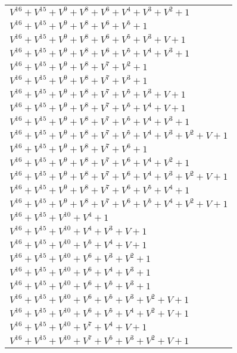 \documentclass[12pt]{article}
\begin{document}
\begin{adjustwidth}{-4cm}{}
\begin{center}
\begin{longtable}{|l|}
$V^{16}  +V^{15}  +V^{9}  +V^{8}  +V^{6}  +V^{4}  +V^{3}  +V^{2}  + 1$ \\
$V^{16}  +V^{15}  +V^{9}  +V^{8}  +V^{6}  +V^{5}  + 1$ \\
$V^{16}  +V^{15}  +V^{9}  +V^{8}  +V^{6}  +V^{5}  +V^{3}  + V + 1$ \\
$V^{16}  +V^{15}  +V^{9}  +V^{8}  +V^{6}  +V^{5}  +V^{4}  +V^{3}  + 1$ \\
$V^{16}  +V^{15}  +V^{9}  +V^{8}  +V^{7}  +V^{2}  + 1$ \\
$V^{16}  +V^{15}  +V^{9}  +V^{8}  +V^{7}  +V^{3}  + 1$ \\
$V^{16}  +V^{15}  +V^{9}  +V^{8}  +V^{7}  +V^{5}  +V^{3}  + V + 1$ \\
$V^{16}  +V^{15}  +V^{9}  +V^{8}  +V^{7}  +V^{5}  +V^{4}  + V + 1$ \\
$V^{16}  +V^{15}  +V^{9}  +V^{8}  +V^{7}  +V^{5}  +V^{4}  +V^{3}  + 1$ \\
$V^{16}  +V^{15}  +V^{9}  +V^{8}  +V^{7}  +V^{5}  +V^{4}  +V^{3}  +V^{2}  + V + 1$ \\
$V^{16}  +V^{15}  +V^{9}  +V^{8}  +V^{7}  +V^{6}  + 1$ \\
$V^{16}  +V^{15}  +V^{9}  +V^{8}  +V^{7}  +V^{6}  +V^{4}  +V^{2}  + 1$ \\
$V^{16}  +V^{15}  +V^{9}  +V^{8}  +V^{7}  +V^{6}  +V^{4}  +V^{3}  +V^{2}  + V + 1$ \\
$V^{16}  +V^{15}  +V^{9}  +V^{8}  +V^{7}  +V^{6}  +V^{5}  +V^{4}  + 1$ \\
$V^{16}  +V^{15}  +V^{9}  +V^{8}  +V^{7}  +V^{6}  +V^{5}  +V^{4}  +V^{2}  + V + 1$ \\
$V^{16}  +V^{15}  +V^{10}  +V^{4}  + 1$ \\
$V^{16}  +V^{15}  +V^{10}  +V^{4}  +V^{3}  + V + 1$ \\
$V^{16}  +V^{15}  +V^{10}  +V^{5}  +V^{4}  + V + 1$ \\
$V^{16}  +V^{15}  +V^{10}  +V^{6}  +V^{3}  +V^{2}  + 1$ \\
$V^{16}  +V^{15}  +V^{10}  +V^{6}  +V^{4}  +V^{3}  + 1$ \\
$V^{16}  +V^{15}  +V^{10}  +V^{6}  +V^{5}  +V^{3}  + 1$ \\
$V^{16}  +V^{15}  +V^{10}  +V^{6}  +V^{5}  +V^{3}  +V^{2}  + V + 1$ \\
$V^{16}  +V^{15}  +V^{10}  +V^{6}  +V^{5}  +V^{4}  +V^{2}  + V + 1$ \\
$V^{16}  +V^{15}  +V^{10}  +V^{7}  +V^{4}  + V + 1$ \\
$V^{16}  +V^{15}  +V^{10}  +V^{7}  +V^{5}  +V^{3}  +V^{2}  + V + 1$ \\

\end{longtable}
\end{center}
\end{adjustwidth}
\end{document}
